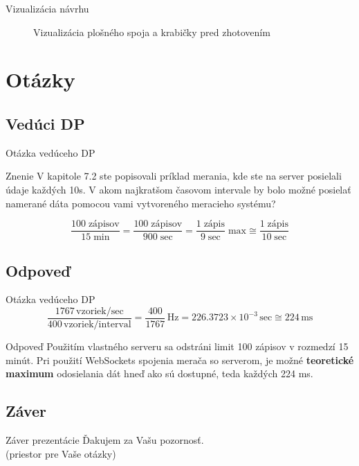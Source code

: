\documentclass[hyperref={unicode}]{beamer}
\begin{document}
\begin{frame}{Vizualizácia návrhu}
\begin{figure}[htp]
		\caption{Vizualizácia plošného spoja a krabičky pred zhotovením}
	\end{figure}
\end{frame}


\section{Otázky}
\label{sec:Otázky}


\subsection{Vedúci DP}
\label{sub:Vedúci}

\begin{frame}{Otázka vedúceho DP}
	\begin{block}{Znenie}
		V kapitole 7.2 ste popisovali príklad merania, kde ste na server posielali údaje každých 10s. V akom najkratšom časovom intervale by bolo možné posielať namerané dáta pomocou vami vytvoreného meracieho systému?
	\end{block}

	\begin{equation*}
		\frac{100\;\text{zápisov}}{15\;\text{min}} = \frac{100\;\text{zápisov}}{900\;\text{sec}} = \frac{1\;\text{zápis}}{9\;\text{sec}}\;\text{max} \cong \frac{1\;\text{zápis}}{10\;\text{sec}}
	\end{equation*}
\end{frame}

\subsection{Odpoveď}
\label{sub:Odpoveď}

\begin{frame}{Otázka vedúceho DP}
	\begin{equation*}
		\frac{1767\,\text{vzoriek/sec}}{400\,\text{vzoriek/interval}} = \frac{400}{1767}\,\text{Hz} = 226.3723\times 10^{-3}\,\text{sec}\cong 224\,\text{ms}
	\end{equation*}

	\begin{block}{Odpoveď}
		Použitím vlastného serveru sa odstráni limit 100 zápisov v rozmedzí 15 minút. Pri použití WebSockets spojenia merača so serverom, je možné \textbf{teoretické maximum} odosielania dát hneď ako sú dostupné, teda každých 224 ms.
	\end{block}
\end{frame}


\subsection{Záver}
\label{sub:Záver}

\begin{frame}{Záver prezentácie}
	\centering
	{\Large Ďakujem za Vašu pozornosť. \\ (priestor pre Vaše otázky)}
\end{frame}
\end{document}
